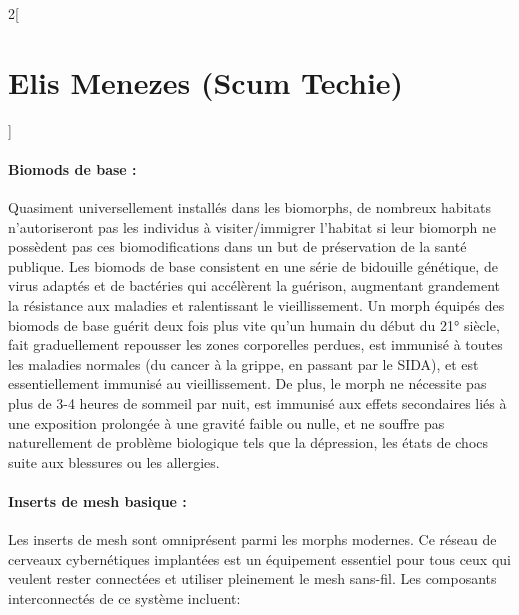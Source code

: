 \documentclass[a4paper,9pt]{article}
\begin{document}
\begin{multicols}{2}[\section*{Elis Menezes (Scum Techie)}]
   \paragraph{Biomods de base :} 
   Quasiment universellement  installés dans les biomorphs, de nombreux habitats
   n'autoriseront pas les individus à visiter/immigrer l'habitat si leur biomorph
   ne possèdent pas ces biomodifications dans un but de préservation de la santé
   publique. Les biomods de base consistent en une série de bidouille génétique,
   de virus adaptés et de bactéries qui accélèrent la guérison, augmentant
   grandement la résistance aux maladies et ralentissant le vieillissement. Un
   morph équipés des biomods de base guérit deux fois plus vite qu'un humain du
   début du 21° siècle, fait graduellement repousser les zones corporelles
   perdues, est immunisé à toutes les maladies normales (du cancer à la grippe, en
   passant par le SIDA), et est essentiellement immunisé au vieillissement. De
   plus, le morph ne nécessite pas plus de 3-4 heures de sommeil par nuit, est
   immunisé aux effets secondaires liés à une exposition prolongée à une gravité
   faible ou nulle, et ne souffre pas naturellement de problème biologique tels
   que la dépression, les états de chocs suite aux blessures ou les allergies.

   \paragraph{Inserts de mesh basique :} 
   Les inserts de mesh sont omniprésent parmi les morphs modernes. Ce réseau de
   cerveaux cybernétiques implantées est un équipement essentiel pour tous ceux
   qui veulent rester connectées et utiliser pleinement le mesh sans-fil. Les
   composants interconnectés de ce système incluent: 


\end{multicols}
\end{document}
